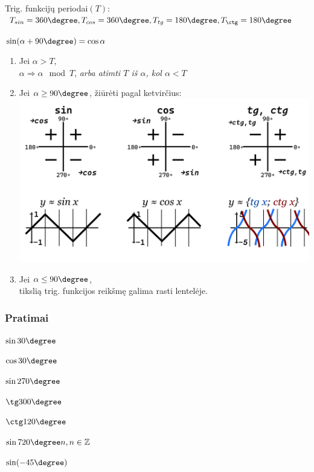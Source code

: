 Trig. funkcijų periodai$(T)$: $T_{sin} = 360\degree, T_{cos} = 360\degree, T_{tg} = 180\degree, T_{\ctg} = 180\degree $

$\sin(\alpha + 90\degree) = \cos\alpha$
\begin{enumerate}
    \item Jei $\alpha > T$, \\
        $\alpha \Rightarrow \alpha \mod T$, \textit{arba atimti $T$ iš $\alpha$, kol $\alpha < T$}
    \item Jei $\alpha \ge 90\degree$, žiūrėti pagal ketvirčius: \\
        \includegraphics[scale=0.25]{assets/reduction.png} 
    \item Jei $\alpha \le 90\degree$, \\
        tikslią trig. funkcijos reikšmę galima rasti lentelėje.

\end{enumerate}

\subsubsection{Pratimai}

\begin{exercises}
    \item $\sin 30\degree         $
    \item $\cos 30\degree         $
    \item $\sin 270\degree        $
    \item $\tg  300\degree        $ 
    \item $\ctg 120\degree        $
    \item $\sin 720\degree n, n \in \mathbb{Z} $
    \item $\sin(-45\degree) $
\end{exercises} 


